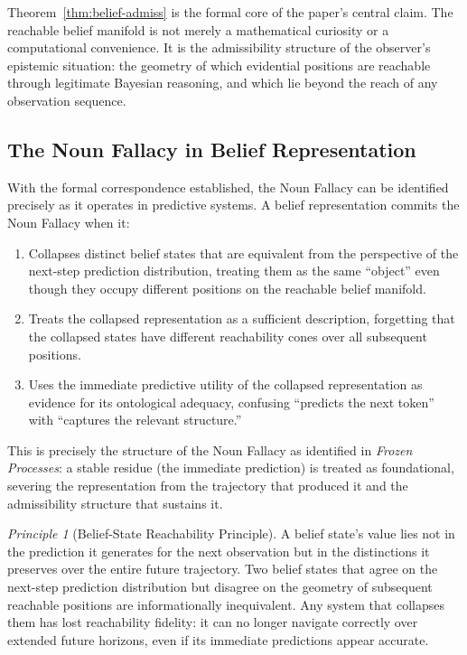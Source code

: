 \documentclass[12pt, a4paper]{article}
\theoremstyle{plain}
\theoremstyle{definition}
\theoremstyle{remark}
\newtheorem{principle}[theorem]{Principle}
\begin{document}
Theorem~\ref{thm:belief-admiss} is the formal core of the paper's central
claim. The reachable belief manifold is not merely a mathematical curiosity
or a computational convenience. It is the admissibility structure of the
observer's epistemic situation: the geometry of which evidential positions
are reachable through legitimate Bayesian reasoning, and which lie beyond
the reach of any observation sequence.

\subsection{The Noun Fallacy in Belief Representation}

With the formal correspondence established, the Noun Fallacy can be
identified precisely as it operates in predictive systems. A belief
representation commits the Noun Fallacy when it:

\begin{enumerate}[leftmargin=*, label=(\roman*)]
\item Collapses distinct belief states that are equivalent from the
perspective of the next-step prediction distribution, treating them as
the same ``object'' even though they occupy different positions on the
reachable belief manifold.

\item Treats the collapsed representation as a sufficient description,
forgetting that the collapsed states have different reachability cones
over all subsequent positions.

\item Uses the immediate predictive utility of the collapsed representation
as evidence for its ontological adequacy, confusing ``predicts the next
token'' with ``captures the relevant structure.''
\end{enumerate}

This is precisely the structure of the Noun Fallacy as identified in
\emph{Frozen Processes}: a stable residue (the immediate prediction) is
treated as foundational, severing the representation from the trajectory
that produced it and the admissibility structure that sustains it.

\begin{principle}[Belief-State Reachability Principle]
\label{prin:belief-reach}
A belief state's value lies not in the prediction it generates for the
next observation but in the distinctions it preserves over the entire
future trajectory. Two belief states that agree on the next-step
prediction distribution but disagree on the geometry of subsequent
reachable positions are informationally inequivalent. Any system that
collapses them has lost reachability fidelity: it can no longer navigate
correctly over extended future horizons, even if its immediate predictions
appear accurate.
\end{principle}
\end{document}
